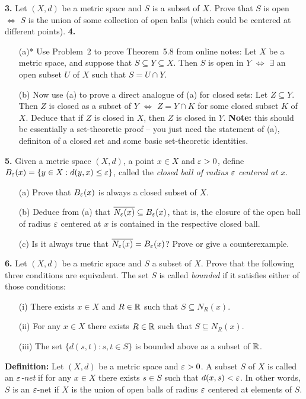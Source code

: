 \documentclass[11pt]{amsart}
\begin{document}
\skv
{\bf 3.} Let $(X,d)$ be a metric space and $S$ is a subset of $X$. Prove that $S$ is open $\iff$ $S$ is the union
of some collection of open balls (which could be centered at different points).
\skv
{\bf 4.} 
\begin{itemize}
\item[(a)*] Use Problem~2 to prove Theorem~5.8 from online notes: Let $X$ be a metric space, and suppose that $S\subseteq Y\subseteq X$. Then $S$ is open in $Y$ $\iff$ $\exists$ an open subset $U$ of $X$ such that $S=U\cap Y$.
\item[(b)] Now use (a) to prove a direct analogue of (a) for closed sets: Let $Z\subseteq Y$. Then $Z$ is closed as a subset of $Y$ $\iff$ $Z=Y\cap K$ for some closed subset $K$ of $X$. Deduce that if $Z$ is closed in $X$, then $Z$ is closed in $Y$. {\bf Note:} this should be essentially a set-theoretic proof -- you just need the statement of (a), definiton of a closed set and some basic set-theoretic identities.
\end{itemize}
\skv
{\bf 5.} Given a metric space $(X,d)$, a point $x\in X$ and ${\varepsilon}>0$, define
$B_{{\varepsilon}}(x)=\{y\in X: d(y,x)\leq {\varepsilon}\}$, called the {\it closed ball of radius
${\varepsilon}$ centered at $x$}. 
\begin{itemize}
\item[(a)] Prove that $B_{{\varepsilon}}(x)$ is always a closed subset of $X$.
\item[(b)] Deduce from (a) that $\overline{N_{{\varepsilon}}(x)}\subseteq B_{{\varepsilon}}(x)$,
that is, the closure of the open ball of radius ${\varepsilon}$ centered at $x$
is contained in the respective closed ball.
\item[(c)] Is it always true that $\overline{N_{{\varepsilon}}(x)}= B_{{\varepsilon}}(x)$?
Prove or give a counterexample.
\end{itemize}
\skv
{\bf 6.} Let $(X,d)$ be a metric space and $S$ a subset of $X$. Prove that the following three conditions are equivalent. The set $S$ is called {\it bounded} if it satisfies either of those conditions:
\begin{itemize}
\item[(i)] There exists $x\in X$ and $R\in{\mathbb R}$ such that $S\subseteq  N_{R}(x)$.
\item[(ii)] For any $x\in X$ there exists $R\in{\mathbb R}$ such that $S\subseteq N_{R}(x)$.
\item[(iii)] The set $\{d(s,t): s,t\in S\}$ is bounded above as a subset of ${\mathbb R}$.
\end{itemize}
\skv
\skv
{\bf Definition:} Let $(X,d)$ be a metric space and ${\varepsilon}>0$. A subset $S$ of $X$
is called an {\it ${\varepsilon}$-net} if for any $x\in X$ there exists $s\in S$
such that $d(x,s)<{\varepsilon}$. In other words, $S$ is an ${\varepsilon}$-net if 
$X$ is the union of open balls of radius ${\varepsilon}$ centered at elements of $S$.
\end{document}
